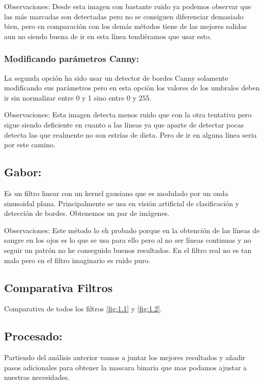 Observaciones:
Desde esta imagen con bastante ruido ya podemos observar que las más marcadas son detectadas pero no se consiguen diferenciar demasiado bien, pero en comparación con los demás métodos tiene de las mejores salidas aun no siendo buena de ir en esta línea tendiéramos que usar esto.

\subsubsection{Modificando parámetros Canny:}

La segunda opción ha sido usar un detector de bordes Canny solamente modificando sus parámetros pero en esta opción los valores de los umbrales deben ir sin normalizar entre 0 y 1 sino entre 0 y 255.


Observaciones:
Esta imagen detecta menos ruido que con la otra tentativa pero sigue siendo deficiente en cuanto a las líneas ya que aparte de detectar pocas detecta las que realmente no son estrías de dieta. Pero de ir en alguna línea seria por este camino.



\subsection{Gabor:}

Es un filtro linear con un kernel gausiano  que es modulado por un onda sinusoidal plana. Principalmente se usa en visión artificial de clasificación y detección de bordes.
Obtenemos un par de imágenes.



Observaciones:
Este método lo eh probado porque en la obtención de las líneas de sangre en los ojos es lo que se usa para ello pero al no ser líneas continuas y no seguir un patrón no he conseguido buenos resultados. En el filtro real no es tan malo pero en el filtro imaginario es ruido puro.
\subsection{Comparativa Filtros}
Comparativa de todos los filtros \ref{fig:1.1} y \ref{fig:1.2}. 

\subsection{Procesado:}
Partiendo del análisis anterior vamos a juntar los mejores resultados y añadir pasos adicionales para obtener la mascara binaria que mas podamos ajustar a nuestras necesidades.


